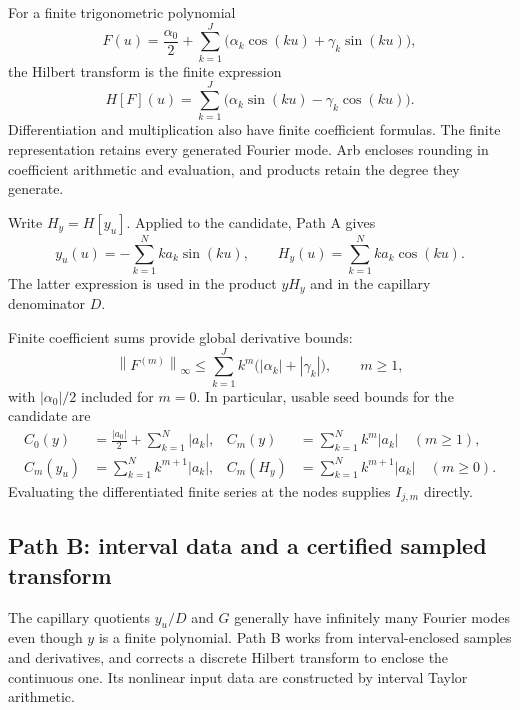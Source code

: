 \documentclass[11pt]{article}
\numberwithin{equation}{section}
\newcommand{\norm}[1]{\left\|#1\right\|_{\infty}}
\newcommand{\HH}{H_y}
\begin{document}
For a finite trigonometric polynomial
\begin{equation}
 F(u)=\frac{\alpha_0}{2}
 +\sum_{k=1}^{J}\bigl(\alpha_k\cos(ku)+\gamma_k\sin(ku)\bigr),
\end{equation}
the Hilbert transform is the finite expression
\begin{equation}
 H[F](u)=\sum_{k=1}^{J}
 \bigl(\alpha_k\sin(ku)-\gamma_k\cos(ku)\bigr).
 \label{eq:path-a}
\end{equation}
Differentiation and multiplication also have finite coefficient formulas.
The finite representation retains every generated Fourier mode. Arb
encloses rounding in coefficient arithmetic and evaluation, and products
retain the degree they generate.

Write $\HH=H[y_u]$. Applied to the candidate, Path A gives
\begin{equation}
 y_u(u)=-\sum_{k=1}^{N}ka_k\sin(ku),\qquad
 \HH(u)=\sum_{k=1}^{N}ka_k\cos(ku).
 \label{eq:A-Hy}
\end{equation}
The latter expression is used in the product $y\HH$ and in the capillary
denominator $D$.

Finite coefficient sums provide global derivative bounds:
\begin{equation}
 \norm{F^{(m)}}\leq
 \sum_{k=1}^{J}k^m\bigl(|\alpha_k|+|\gamma_k|\bigr),
 \qquad m\geq1,
 \label{eq:trig-bound}
\end{equation}
with $|\alpha_0|/2$ included for $m=0$. In particular, usable seed bounds
for the candidate are
\begin{align}
 C_0(y)&=\frac{|a_0|}{2}+\sum_{k=1}^{N}|a_k|,
 &C_m(y)&=\sum_{k=1}^{N}k^m|a_k|\quad(m\geq1),\label{eq:y-bounds}\\
 C_m(y_u)&=\sum_{k=1}^{N}k^{m+1}|a_k|,
 &C_m(\HH)&=\sum_{k=1}^{N}k^{m+1}|a_k|\quad(m\geq0).
 \label{eq:A-Hy-bounds}
\end{align}
Evaluating the differentiated finite series at the nodes supplies
$I_{j,m}$ directly.

\subsection{Path B: interval data and a certified sampled transform}
\label{sec:path-b}

The capillary quotients $y_u/D$ and $G$ generally have infinitely many
Fourier modes even though $y$ is a finite polynomial. Path B works from
interval-enclosed samples and derivatives, and corrects a discrete Hilbert
transform to enclose the continuous one. Its nonlinear input data are
constructed by interval Taylor arithmetic.
\end{document}
